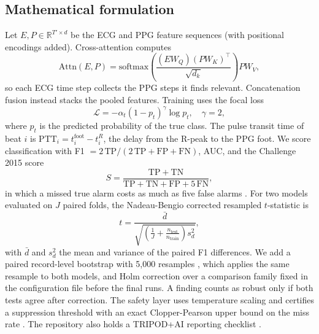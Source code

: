\documentclass[conference]{IEEEtran}
\begin{document}
\subsection{Mathematical formulation}
Let $E,P\in\mathbb{R}^{T'\times d}$ be the ECG and PPG feature sequences (with positional encodings added). Cross-attention computes
\begin{equation}
\mathrm{Attn}(E,P)=\mathrm{softmax}\!\left(\frac{(EW_Q)(PW_K)^{\top}}{\sqrt{d_k}}\right)PW_V,
\label{eq:attn}
\end{equation}
so each ECG time step collects the PPG steps it finds relevant. Concatenation fusion instead stacks the pooled features. Training uses the focal loss \cite{lin2017focal}
\begin{equation}
\mathcal{L}=-\alpha_t(1-p_t)^{\gamma}\log p_t,\quad \gamma=2,
\label{eq:focal}
\end{equation}
where $p_t$ is the predicted probability of the true class. The pulse transit time of beat $i$ is $\mathrm{PTT}_i=t^{\mathrm{foot}}_i-t^{R}_i$, the delay from the R-peak to the PPG foot. We score classification with F1 $=2\,\mathrm{TP}/(2\,\mathrm{TP}+\mathrm{FP}+\mathrm{FN})$, AUC, and the Challenge 2015 score
\begin{equation}
S=\frac{\mathrm{TP}+\mathrm{TN}}{\mathrm{TP}+\mathrm{TN}+\mathrm{FP}+5\,\mathrm{FN}},
\label{eq:score}
\end{equation}
in which a missed true alarm costs as much as five false alarms \cite{clifford2015challenge}. For two models evaluated on $J$ paired folds, the Nadeau-Bengio corrected resampled $t$-statistic \cite{nadeau2003inference} is
\begin{equation}
t=\frac{\bar d}{\sqrt{\left(\frac{1}{J}+\frac{n_{\mathrm{test}}}{n_{\mathrm{train}}}\right)s_d^{2}}},
\label{eq:nb}
\end{equation}
with $\bar d$ and $s_d^2$ the mean and variance of the paired F1 differences. We add a paired record-level bootstrap with 5,000 resamples \cite{efron1994bootstrap}, which applies the same resample to both models, and Holm correction \cite{holm1979} over a comparison family fixed in the configuration file before the final runs. A finding counts as robust only if both tests agree after correction. The safety layer uses temperature scaling \cite{guo2017calibration} and certifies a suppression threshold with an exact Clopper-Pearson upper bound on the miss rate \cite{clopper1934}. The repository also holds a TRIPOD+AI reporting checklist \cite{collins2024tripod}.
\end{document}
